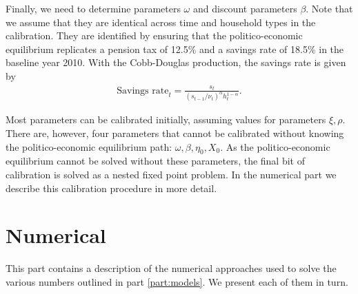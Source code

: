 \documentclass[a4paper]{article}
\begin{document}
Finally, we need to determine parameters $\omega$ and discount parameters $\beta$. Note that we assume that they are identical across time and household types in the calibration. They are identified by ensuring that the politico-economic equilibrium replicates a pension tax of 12.5\% and a savings rate of 18.5\% in the baseline year 2010. With the Cobb-Douglas production, the savings rate is given by
\begin{align*}
    \text{Savings rate}_t = \frac{s_t}{\left(s_{t-1}/\nu_t\right)^{\alpha} h_t^{1-\alpha}}.
\end{align*}


Most parameters can be calibrated initially, assuming values for parameters $\xi, \rho$. There are, however, four parameters that cannot be calibrated without knowing the politico-economic equilibrium path: $\omega, \beta, \eta_0, X_0$. As the politico-economic equilibrium cannot be solved without these parameters, the final bit of calibration is solved as a nested fixed point problem. In the numerical part \ref{part:num} we describe this calibration procedure in more detail. 




\clearpage
\part{Numerical}\label{part:num}

This part contains a description of the numerical approaches used to solve the various numbers outlined in part \ref{part:models}. We present each of them in turn.

\edef\refsec{sec:num:infana}
\edef\refmodelsec{sec:models:infana}
\edef\refeq{eq:num:infana}
\edef\refmodeleq{eq:models:infana}
\edef\refalg{alg:num:infana}
\end{document}
